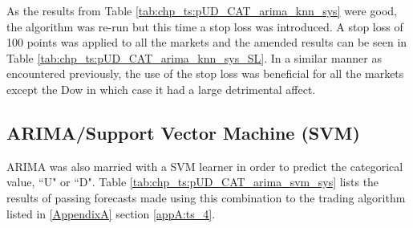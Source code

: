 

As the results from Table \ref{tab:chp_ts:pUD_CAT_arima_knn_sys} were good, the algorithm was re-run but this time a stop loss was introduced. A stop loss of 100 points was applied to all the markets and the amended results can be seen in Table \ref{tab:chp_ts:pUD_CAT_arima_knn_sys_SL}. In a similar manner as encountered previously, the use of the stop loss was beneficial for all the markets except the Dow in which case it had a large detrimental affect.




\subsection{ARIMA/Support Vector Machine (SVM)}

ARIMA was also married with a SVM learner in order to predict the categorical value, \textquotedblleft U" or \textquotedblleft D". Table \ref{tab:chp_ts:pUD_CAT_arima_svm_sys} lists the results of passing forecasts made using this combination to the trading algorithm listed in \ref{AppendixA} section \ref{appA:ts_4}.




